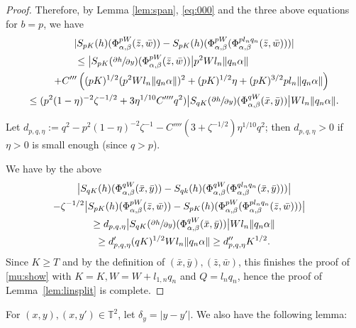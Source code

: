 \documentclass[10pt]{amsart}
\theoremstyle{definition}
\theoremstyle{plain}
\newcommand\TT{\mathbb{T}}
\begin{document}
\begin{proof}
Therefore, by Lemma \ref{lem:span}, \eqref{eq:000} and the three above equations for $b=p$, we have\vspace*{-2pt}
\begin{multline*}
|S_{pK}(h)(\Phi_{\alpha,\beta}^{pW}(\bar{z},\bar{w}))-
S_{pK}(h)(\Phi_{\alpha,\beta}^{pW}(\Phi_{\alpha,\beta}^{pl_nq_n}(\bar{z},\bar{w})))| \\
\hspace*{-1.5cm}\leq
\bigl|S_{pK}(\sfrac{\partial h}{\partial y})(\Phi_{\alpha,\beta}^{pW}(\bar{z},\bar{w}))\bigr|p^2Wl_n\|q_n\alpha\| \\
\shoveright{+
C'''\left( (pK)^{1/2}(p^2Wl_n\|q_n\alpha\|)^2 +(pK)^{1/2}\eta +
(pK)^{3/2}pl_n\|q_n\alpha\|\right)}
\\ \leq (p^2 (1-\eta)^{-2}\zeta^{-1/2} + 3\eta^{1/10}C'''' q^2)\bigl|S_{qK}(\sfrac{\partial h}{\partial y})
(\Phi_{\alpha,\beta}^{qW}(\bar{x},\bar{y}))\bigr|Wl_n\|q_n\alpha\|.
\end{multline*}

Let $d_{p,q,\eta}:= q^2- p^2 (1-\eta)^{-2}\zeta^{-1} - C'''' (3+ \zeta^{-1/2})\eta^{1/10} q^2 $; then $d_{p,q,\eta}>0$ if $\eta>0$ is small enough (since $q>p$).

We have by the above\vspace*{-2pt}
\begin{multline*}
\bigl|S_{qK}(h)(\Phi_{\alpha,\beta}^{qW}(\bar{x},\bar{y}))-
S_{qk}(h)(\Phi_{\alpha,\beta}^{qW}(\Phi_{\alpha,\beta}^{ql_nq_n}(\bar{x},\bar{y})))\bigr|\\
\shoveright{-\zeta^{-1/2}\bigl|S_{pK}(h)(\Phi_{\alpha,\beta}^{pW}(\bar{z},\bar{w}))-
S_{pK}(h)(\Phi_{\alpha,\beta}^{pW}(\Phi_{\alpha,\beta}^{pl_nq_n}(\bar{z},\bar{w})))\bigr|}\\
\geq
d_{p,q,\eta}\bigl|S_{qK}(\sfrac{\partial h}{\partial y})(\Phi_{\alpha,\beta}^{qW}(\bar{x},\bar{y}))\bigr|Wl_n\|q_n\alpha\|\\
\geq
d'_{p,q,\eta}(qK)^{1/2}Wl_n\|q_n\alpha\|\geq d''_{p,q,\eta}K^{1/2}.
\end{multline*}
Since $K\geq T$ and by the definition of $(\bar{x},\bar{y}),(\bar{z},\bar{w})$, this finishes the proof of \eqref{mu:show} with $K=K,W=W+l_{1,n}q_n$ and $Q=l_nq_n$,
hence the proof of Lemma~\ref{lem:linsplit} is complete.
\end{proof}

For $(x,y),(x,y')\in \TT^2$, let $\delta_y=\vert y-y'\vert$.
We also have the following lemma:
\end{document}
